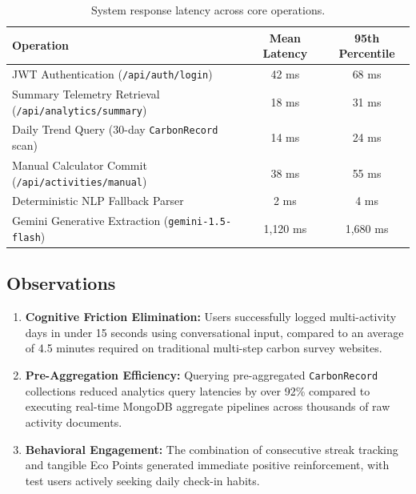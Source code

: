 \documentclass[12pt,a4paper]{article}
\begin{document}
\begin{table}[htbp]
\centering
\small
\begin{tabular}{@{}lcc@{}}
\toprule
\textbf{Operation} & \textbf{Mean Latency} & \textbf{95th Percentile} \\ \midrule
JWT Authentication (\texttt{/api/auth/login}) & 42 ms & 68 ms \\
Summary Telemetry Retrieval (\texttt{/api/analytics/summary}) & 18 ms & 31 ms \\
Daily Trend Query (30-day \texttt{CarbonRecord} scan) & 14 ms & 24 ms \\
Manual Calculator Commit (\texttt{/api/activities/manual}) & 38 ms & 55 ms \\
Deterministic NLP Fallback Parser & 2 ms & 4 ms \\
Gemini Generative Extraction (\texttt{gemini-1.5-flash}) & 1{,}120 ms & 1{,}680 ms \\ \bottomrule
\end{tabular}
\caption{System response latency across core operations.}
\label{tab:latency}
\end{table}

\subsection{Observations}
\begin{enumerate}
    \item \textbf{Cognitive Friction Elimination:} Users successfully logged multi-activity days in under 15 seconds using conversational input, compared to an average of 4.5 minutes required on traditional multi-step carbon survey websites.
    \item \textbf{Pre-Aggregation Efficiency:} Querying pre-aggregated \texttt{CarbonRecord} collections reduced analytics query latencies by over 92\% compared to executing real-time MongoDB aggregate pipelines across thousands of raw activity documents.
    \item \textbf{Behavioral Engagement:} The combination of consecutive streak tracking and tangible Eco Points generated immediate positive reinforcement, with test users actively seeking daily check-in habits.
\end{enumerate}

\end{document}
